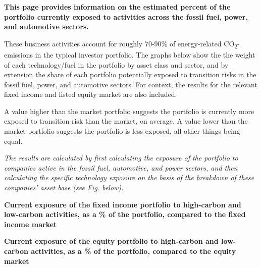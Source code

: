 \documentclass[10pt,table,a4]{article}\usepackage[]{graphicx}\usepackage[]{color}
\begin{document}
	\begin{multicols}{2}

		\textbf{This page provides information on the estimated percent of the portfolio currently exposed to activities across the fossil fuel, power, and automotive sectors. }
		
		These business activities account for roughly 70-90\% of energy-related CO\textsubscript{2}-emissions in the typical investor portfolio. The graphs below show the the weight of each technology/fuel in the portfolio by asset class and sector, and by extension the share of each portfolio potentially exposed to transition risks in the fossil fuel, power, and automotive sectors. For context, the results for the relevant fixed income and listed equity market are also included.
		
		A value higher than the market portfolio suggests the portfolio is currently more exposed to transition risk than the market, on average. A value lower than the market portfolio suggests the portfolio is less exposed, all other things being equal. 

		\textit{The results are calculated by first calculating the exposure of the portfolio to companies active in the fossil fuel, automotive, and power sectors, and then calculating the specific technology exposure on the basis of the breakdown of these companies' asset base (see Fig. below). }
		
		\vspace{-0.1cm}
		
	\end{multicols}
	
	\vspace{-0.7cm}
	\textbf{Current exposure of the fixed income portfolio to high-carbon and low-carbon activities, as a \% of the portfolio, compared to the fixed income market} 
	
	\vspace{-0.2cm}
	
	
	\textbf{Current exposure of the equity portfolio to high-carbon and low-carbon activities, as a \% of the portfolio, compared to the equity market}
	
	\vspace{-0.2cm}
	
\end{document}
